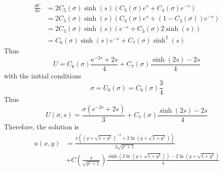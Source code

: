 \documentclass[11pt]{article}
\theoremstyle{mystyle}
\theoremstyle{definition}
\begin{document}
\begin{align*}
  \displaystyle\frac{dU}{ds} &= 2C_5(\sigma) \sinh(s) \left(C_3(\sigma) e^s + C_4(\sigma) e^{-s}\right) \\
  &= 2 C_5(\sigma) \sinh(s) (C_3(\sigma) e^s + (1 - C_3(\sigma)) e^{-s}) \\
  &= 2C_5(\sigma) \sinh(s) (e^{-s} + C_3(\sigma) 2\sinh(s)) \\
  &= C_6(\sigma) \sinh(s) e^{-s} + C_7(\sigma) \sinh^2(s) 
\end{align*}
Thus 
\[
  U = C_6(\sigma) \frac{\mathrm{e}^{-2s} + 2s}{4} + C_7(\sigma)\frac{\sinh\left(2s\right) - 2s}{4}
\]
with the initial conditions
\[
  \sigma = U_0(\sigma) = C_6(\sigma) \displaystyle\frac{3}{4} 
\]
Thus 
\[
  U(\sigma, s) = \displaystyle\frac{\sigma (e^{-2s} + 2s)}{3} + C_7(\sigma) \displaystyle\frac{\sinh(2s) - 2s}{4} 
\]
Therefore, the solution is 
\begin{align*}
  u(x,y) &= \displaystyle\frac{x((y+\sqrt{1+y^2})^{-2} + 2 \ln(y+ \sqrt{1+y^2}))}{3\sqrt{y^2+1}} \\
  & + C\left( \displaystyle\frac{x}{\sqrt{y^2+1}}\right) \displaystyle\frac{\sinh(2\ln(y+ \sqrt{1+y^2}))-2\ln(y + \sqrt{1+y^2})}{4}
\end{align*}
\end{document}
